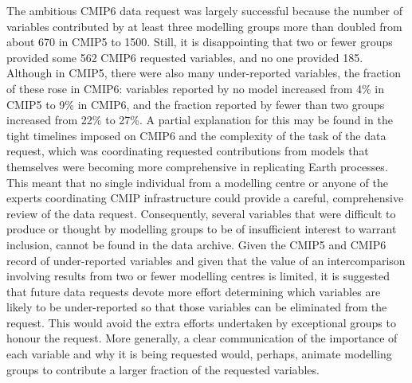 \documentclass[manuscript]{copernicus}
\newcommand{\mycomment}[1]{}
\def\cred#1{{\color{red}#1}}
\begin{document}
The ambitious CMIP6 data request was largely successful because the number of variables contributed by at least three modelling groups more than doubled from about 670 in CMIP5 to 1500. Still, it is disappointing that two or fewer groups provided some 562 CMIP6 requested variables, and no one provided 185. Although in CMIP5, there were also many under-reported variables, the fraction of these rose in CMIP6: variables reported by no model increased from 4\% in CMIP5 to 9\% in CMIP6, and the fraction reported by fewer than two groups increased from 22\% to 27\%. A partial explanation for this may be found in the tight timelines imposed on CMIP6 and the complexity of the task of the data request, which was coordinating requested contributions from models that themselves were becoming more comprehensive in replicating Earth processes. This meant that no single individual from a modelling centre or anyone of the experts coordinating CMIP infrastructure could provide a careful, comprehensive review of the data request. Consequently, several variables that were difficult to produce or thought by modelling groups to be of insufficient interest to warrant inclusion, cannot be found in the data archive. Given the CMIP5 and CMIP6 record of under-reported variables and given that the value of an intercomparison involving results from two or fewer modelling centres is limited, it is suggested that future data requests devote more effort determining which variables are likely to be under-reported so that those variables can be eliminated from the request. This would avoid the extra efforts undertaken by exceptional groups to honour the request. More generally, a clear communication of the importance of each variable and why it is being requested would, perhaps, animate modelling groups to contribute a larger fraction of the requested variables. 


\mycomment{
The CMIP6 ``data request'' \citep{juckes_cmip6_2020} was the most comprehensively outlined preceded by three decades of evolution in climate model understanding. This history underpinned the development of the standard experimental protocols 
\citet{gates_amip_1991} - AMIP1
\citet{gates_amip_1993} - AMIP History Archive
\citet{gates_amip_1994} - AMIP Ensemble
\citet{gleckler_amip_1996} - AMIP 7 monthly mean and six-hourly output, plus ensembles/AMIP 2
\citet{gleckler_amip_1996-1} - AMIP number 8, STANDARD OUTPUT low and high frequency (6-hr)
https://pcmdi.llnl.gov/mips/amip/OUTPUT/WGNEDIAGS/index.html
\citet{taylor_pcmdi_2009}
\citet{taylor_pcmdi_2013}
\citet{juckes_baseline_2025}
FANGIO not multi-year (perpetual July)/January; AMIP1 success, multi-year SST/sea-ice (Russians and Chinese); AMIP2 next-level output, more high-frequency data, mean products (covariances; u/v-prime overbar - on the fly calculation) monthly mean timeseries (Boer \& Lambert 2008, clim dyn - relationship to Lorenz energy cycle)
CMIP2: https://pcmdi.llnl.gov/mips/cmip2/
CMIP3: https://pcmdi.llnl.gov/mips/cmip3/experiment.html
CMIP5: https://pcmdi.llnl.gov/mips/cmip5/requirements.html
}
\end{document}

